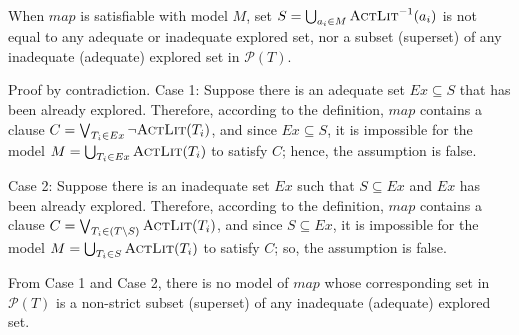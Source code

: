 \begin{lemma}
\label{lem:map:sound}
When $map$ is satisfiable with model $M$, set $S = \bigcup_{a_i \in M} \textsc{ActLit} ^{-1} (a_i)$ is not equal to any adequate or inadequate explored set, nor a subset (superset) of any
inadequate (adequate) explored set in $\mathcal{P}(T)$.
\end{lemma}
\begin{IEEEproof}
Proof by contradiction. Case 1: Suppose there is an adequate set $Ex \subseteq S$ that has been already explored. Therefore, according to the definition, $map$ contains a clause $C = \bigvee_{T_{i}\in Ex} \neg {\textsc{ActLit}(T_i)}$, and since $Ex \subseteq S$, it is impossible for the model $M = \bigcup_{T_i \in Ex} \textsc{ActLit} (T_i)$ to satisfy $C$; hence, the assumption is false.

Case 2: Suppose there is an inadequate set $Ex$ such that $S \subseteq Ex$ and $Ex$ has been already explored. Therefore, according to the definition, $map$ contains a clause $C = \bigvee_{T_{i}\in (T \setminus S)} \textsc{ActLit} (T_i)$, and since $S \subseteq Ex$, it is impossible for the model $M = \bigcup_{T_i \in S} \textsc{ActLit} (T_i)$ to satisfy $C$; so, the assumption is false.

From Case 1 and Case 2, there is no model of $map$ whose corresponding set in $\mathcal{P}(T)$ is a non-strict subset (superset) of any inadequate (adequate) explored set.
\end{IEEEproof}


